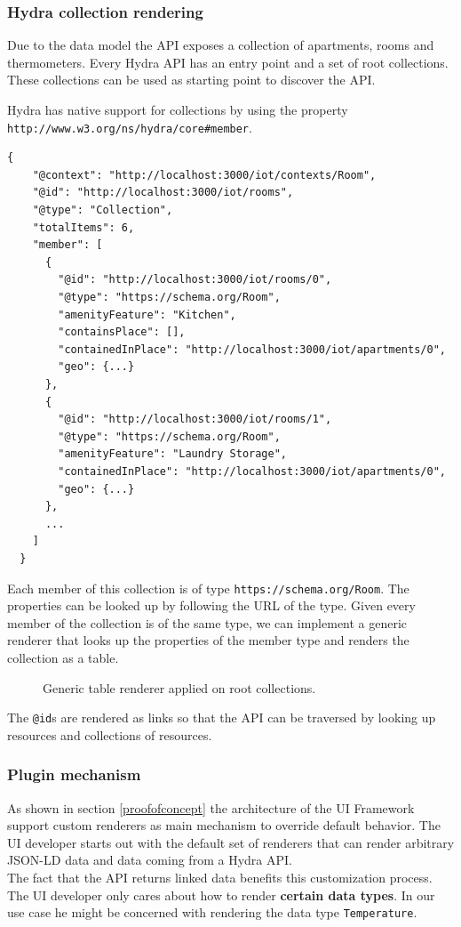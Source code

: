 \subsubsection{Hydra collection rendering}
Due to the data model the API exposes a collection of apartments, rooms and thermometers. Every Hydra API has an entry point and a set of root collections. These collections can be used as starting point to discover the API.

Hydra has native support for collections by using the property \lstinline{http://www.w3.org/ns/hydra/core#member}.

\lstset{language=JSON}
\begin{lstlisting}[caption=Data of /rooms as Hydra collection.]
  {
    "@context": "http://localhost:3000/iot/contexts/Room",
    "@id": "http://localhost:3000/iot/rooms",
    "@type": "Collection",
    "totalItems": 6,
    "member": [
      {
        "@id": "http://localhost:3000/iot/rooms/0",
        "@type": "https://schema.org/Room",
        "amenityFeature": "Kitchen",
        "containsPlace": [],
        "containedInPlace": "http://localhost:3000/iot/apartments/0",
        "geo": {...}
      },
      {
        "@id": "http://localhost:3000/iot/rooms/1",
        "@type": "https://schema.org/Room",
        "amenityFeature": "Laundry Storage",
        "containedInPlace": "http://localhost:3000/iot/apartments/0",
        "geo": {...}
      },
      ...
    ]
  }
\end{lstlisting}

Each member of this collection is of type \lstinline{https://schema.org/Room}. The properties can be looked up by following the URL of the type. Given every member of the collection is of the same type, we can implement a generic renderer that looks up the properties of the member type and renders the collection as a table.

\begin{figure}[!htb]
  \caption{Generic table renderer applied on root collections.}
\end{figure}

The \lstinline{@id}s are rendered as links so that the API can be traversed by looking up resources and collections of resources.

\subsubsection{Plugin mechanism}\label{pluginmechanism}
As shown in section \ref{proofofconcept} the architecture of the UI Framework support custom renderers as main mechanism to override default behavior. The UI developer starts out with the default set of renderers that can render arbitrary JSON-LD data and data coming from a Hydra API. \\
The fact that the API returns linked data benefits this customization process. The UI developer only cares about how to render \textbf{certain data types}. In our use case he might be concerned with rendering the data type \lstinline{Temperature}.

